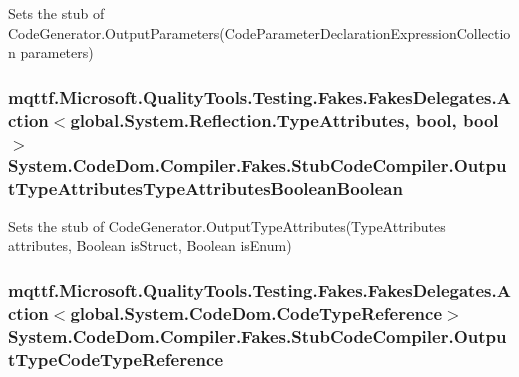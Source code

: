 Sets the stub of Code\-Generator.\-Output\-Parameters(\-Code\-Parameter\-Declaration\-Expression\-Collection parameters)

\hypertarget{class_system_1_1_code_dom_1_1_compiler_1_1_fakes_1_1_stub_code_compiler_a46f8871806f72540a263b0c2054b5647}{
\subsubsection[{Output\-Type\-Attributes\-Type\-Attributes\-Boolean\-Boolean}]{\setlength{\rightskip}{0pt plus 5cm}mqttf.\-Microsoft.\-Quality\-Tools.\-Testing.\-Fakes.\-Fakes\-Delegates.\-Action$<$global.\-System.\-Reflection.\-Type\-Attributes, bool, bool$>$ System.\-Code\-Dom.\-Compiler.\-Fakes.\-Stub\-Code\-Compiler.\-Output\-Type\-Attributes\-Type\-Attributes\-Boolean\-Boolean}}\label{class_system_1_1_code_dom_1_1_compiler_1_1_fakes_1_1_stub_code_compiler_a46f8871806f72540a263b0c2054b5647}


Sets the stub of Code\-Generator.\-Output\-Type\-Attributes(\-Type\-Attributes attributes, Boolean is\-Struct, Boolean is\-Enum)

\hypertarget{class_system_1_1_code_dom_1_1_compiler_1_1_fakes_1_1_stub_code_compiler_ae87f3fc0156c5634ba209d28a81f09e9}{
\subsubsection[{Output\-Type\-Code\-Type\-Reference}]{\setlength{\rightskip}{0pt plus 5cm}mqttf.\-Microsoft.\-Quality\-Tools.\-Testing.\-Fakes.\-Fakes\-Delegates.\-Action$<$global.\-System.\-Code\-Dom.\-Code\-Type\-Reference$>$ System.\-Code\-Dom.\-Compiler.\-Fakes.\-Stub\-Code\-Compiler.\-Output\-Type\-Code\-Type\-Reference}}\label{class_system_1_1_code_dom_1_1_compiler_1_1_fakes_1_1_stub_code_compiler_ae87f3fc0156c5634ba209d28a81f09e9}


